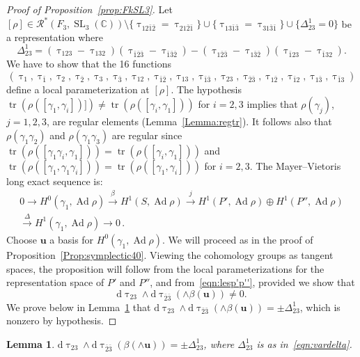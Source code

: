 \documentclass[11pt]{article}
\newtheorem{lemm}[theo]{Lemma}
\theoremstyle{definition}
\numberwithin{equation}{section}
\numberwithin{figure}{section}
\numberwithin{table}{section}
\DeclareMathOperator{\SL}{SL}
\DeclareMathOperator{\Ad}{Ad}
\DeclareMathOperator{\tr}{tr}
\newcommand{\Rcal}{\mathcal{R}}
\newcommand{\Cbb}{\mathbb{C}}
\newcommand{\ubf}{\mathbf{u}}
\newcommand*{\dd}{\mathrm{d}}
\begin{document}
\begin{proof}[Proof of Proposition~\ref{prop:FkSL3}]
Let $[\rho]\in \Rcal^*(F_3,\SL_3(\Cbb))\setminus \{ \uptau_{12\bar 1\bar{2}}= \uptau_{21\bar 2\bar 1} \}\cup
\{ \uptau_{13\bar 1\bar{3}}= \uptau_{31\bar 3\bar 1} \} \cup\{
\varDelta^1_{23} = 0\}$ be a representation where
\begin{equation}\label{eqn:vardelta}
\varDelta^1_{23} = (\uptau_{123}-\uptau_{132}) (\uptau_{\bar 1\bar 2\bar 3}-\uptau_{\bar 1\bar 3\bar 2}) - (\uptau_{1\bar 2\bar 3}-\uptau_{1\bar 3\bar 2}) (\uptau_{\bar 1 2 3}-\uptau_{\bar 1 3 2}).
\end{equation}
We have to show that the 16 functions
\[
(\uptau_1, \uptau_{\bar 1},\uptau_2, \uptau_{\bar 2},\uptau_3, \uptau_{\bar 3}, \uptau_{12}, \uptau_{\bar 1\bar 2}, \uptau_{13}, \uptau_{\bar 1\bar 3},
\uptau_{23}, \uptau_{\bar 2\bar 3},
\uptau_{1\bar 2}, \uptau_{\bar 1 2}, \uptau_{1\bar 3}, \uptau_{\bar 1 3})
\]
define a local parameterization at $[\rho]$. The hypothesis $\tr(\rho([\gamma_1,\gamma_i])])\neq \tr(\rho([\gamma_i,\gamma_1]))$ for $i=2,3$ implies that $\rho(\gamma_j)$, $j=1,2,3$, are regular elements (Lemma~\ref{Lemma:regtr}). It follows also that $\rho(\gamma_{1}\gamma_2)$ and $\rho(\gamma_{1}\gamma_3)$ are regular since $\tr(\rho([\gamma_1\gamma_i,\gamma_1])) = \tr(\rho([\gamma_i,\gamma_1]))$ and $\tr(\rho([\gamma_1,\gamma_1\gamma_i])) = \tr(\rho([\gamma_1,\gamma_i]))$ for $i=2,3$. The Mayer--Vietoris long exact sequence is:
\begin{multline}\label{eqn:lesp'p''}
0\to H^0(\gamma_1,\Ad\rho)
\xrightarrow{\beta} H^1(S,\Ad\rho)
\xrightarrow{j} H^1(P',\Ad\rho)\oplus H^1(P'',\Ad\rho)\\
\xrightarrow{\Delta} H^1(\gamma_1,\Ad\rho)\to 0\,.
\end{multline}
Choose $\ubf$ a basis for $H^0(\gamma_1,\Ad\rho) $. We will proceed as in the proof of Proposition~\ref{Prop:symplectic40}. Viewing the cohomology groups as tangent spaces, the proposition will follow from the local parameterizations for the representation space of $P'$ and $P''$, and from~\eqref{eqn:lesp'p''}, provided we show that
\begin{equation*}
\dd \uptau_{23}\wedge \dd \uptau_ {\bar 2\bar 3} (\wedge \beta(\ubf))\neq 0.
\end{equation*}
We prove below in Lemma~\ref{lemma:nuDelta} that $ \dd \uptau_{23}\wedge \dd \uptau_ {\bar 2\bar 3} (\wedge \beta(\ubf))=\pm \varDelta^1_{23}$, which is nonzero by hypothesis.
\end{proof}
\goodbreak


\begin{lemm}\label{lemma:nuDelta}
$ \dd \uptau_{23}\wedge \dd \uptau_ {\bar 2\bar 3} (\beta(\wedge\ubf))=\pm \varDelta^1_{23}$, where $\varDelta^1_{23}$ is as in~\eqref{eqn:vardelta}.
\end{lemm}
\end{document}
